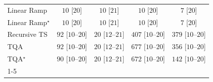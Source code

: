 \begin{tabular}{l|cccc|}
Linear Ramp & {\cellcolor[HTML]{F7FCF5}} \color[HTML]{000000} $10$ [$20$] & {\cellcolor[HTML]{F7FCF5}} \color[HTML]{000000} $10$ [$21$] & {\cellcolor[HTML]{F7FCF5}} \color[HTML]{000000} $10$ [$20$] & {\cellcolor[HTML]{F7FCF5}} \color[HTML]{000000} $7$ [$20$] \\
Linear Ramp$^\star$ & {\cellcolor[HTML]{F7FCF5}} \color[HTML]{000000} $10$ [$20$] & {\cellcolor[HTML]{F7FCF5}} \color[HTML]{000000} $10$ [$21$] & {\cellcolor[HTML]{F7FCF5}} \color[HTML]{000000} $10$ [$20$] & {\cellcolor[HTML]{F7FCF5}} \color[HTML]{000000} $7$ [$20$] \\
Recursive TS & {\cellcolor[HTML]{E7F6E3}} \color[HTML]{000000} $92$ [$10$--$20$] & {\cellcolor[HTML]{F5FBF2}} \color[HTML]{000000} $20$ [$12$--$21$] & {\cellcolor[HTML]{6DC072}} \color[HTML]{000000} $407$ [$10$--$20$] & {\cellcolor[HTML]{7AC77B}} \color[HTML]{000000} $379$ [$10$--$20$] \\
TQA & {\cellcolor[HTML]{E7F6E3}} \color[HTML]{000000} $92$ [$10$--$20$] & {\cellcolor[HTML]{F5FBF2}} \color[HTML]{000000} $20$ [$12$--$21$] & {\cellcolor[HTML]{016E2D}} \color[HTML]{F1F1F1} $677$ [$10$--$20$] & {\cellcolor[HTML]{86CC85}} \color[HTML]{000000} $356$ [$10$--$20$] \\
TQA$^\star$ & {\cellcolor[HTML]{E8F6E3}} \color[HTML]{000000} $90$ [$10$--$20$] & {\cellcolor[HTML]{F5FBF2}} \color[HTML]{000000} $20$ [$12$--$21$] & {\cellcolor[HTML]{03702E}} \color[HTML]{F1F1F1} $672$ [$10$--$20$] & {\cellcolor[HTML]{DAF0D4}} \color[HTML]{000000} $142$ [$10$--$20$] \\
\cline{1-5}
\bottomrule
\end{tabular}
